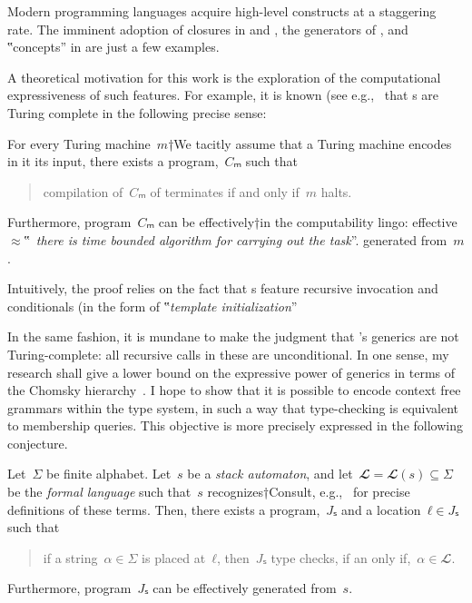 Modern programming languages acquire high-level constructs
  at a staggering rate.
The imminent adoption of closures in \Java and \CC,
  the generators of \CSharp, and ‟concepts” in
  \CC are just a few examples.

A theoretical motivation for this work
  is the exploration of the computational
  expressiveness of such features.
For example, it is known (see e.g.,~\cite{Gutterman:MSc} that
  s are Turing complete in the following precise sense:

\begin{Theorem}
  \label{Theorem:Gutterman}
For every Turing machine~$m$†{We tacitly assume that a Turing machine
  encodes in it its input}, there exists a \CC program,~$Cₘ$ such that
\begin{quote}
  compilation of~$Cₘ$ of terminates if and only if~$m$ halts.
\end{quote}
Furthermore, program~$Cₘ$ can be effectively†{in the computability lingo:
  effective~$≈$‟~\emph{there is time
  bounded algorithm for carrying out the task}”.} generated from~$m$.
\end{Theorem}

Intuitively, the proof relies on the fact that s
  feature recursive invocation and conditionals (in the form of
  ‟\emph{template initialization}”

In the same fashion, it is mundane to make the judgment that
  \Java's generics are not Turing-complete: all recursive calls
  in these are unconditional.
In one sense, my research shall give a lower bound on the
  expressive power of \Java generics in terms of the Chomsky hierarchy~\cite{Chomsky}.
I hope to show that it is possible to encode context free grammars within the \Java type system,
  in such a way that type-checking is equivalent to membership queries.
This objective is more precisely expressed in the following conjecture.

\begin{Conjecture}
\label{Conjecture:Gil:Levy}
Let~$Σ$ be finite alphabet.
  Let~$s$ be a \emph{stack automaton}, and let~$𝓛=𝓛(s)⊆Σ$ be
  the \emph{formal language} such that~$s$ recognizes†{Consult, e.g.,~\cite{Automatim} for precise definitions of these terms}.
Then, there exists a \Java program,~$Jₛ$ and a location~$ℓ∈Jₛ$
such that 
\begin{quote}
  if a string~$α∈Σ$ is
  placed at~$ℓ$, then~$Jₛ$ type checks, if an only if,~$α∈𝓛$.
\end{quote}
Furthermore, program~$Jₛ$ can be effectively generated from~$s$.
\end{Conjecture}

